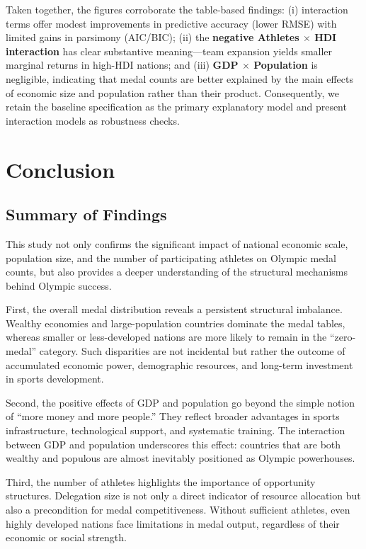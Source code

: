\documentclass[11pt,twoside]{article}
\numberwithin{Theorem}{section}
\numberwithin{Definition}{section}
\numberwithin{Lemma}{section}
\numberwithin{Algorithm}{section}
\numberwithin{equation}{section}
\begin{document}
Taken together, the figures corroborate the table-based findings: (i) interaction terms offer modest improvements in predictive accuracy (lower RMSE) with limited gains in parsimony (AIC/BIC); (ii) the \textbf{negative Athletes $\times$ HDI interaction} has clear substantive meaning—team expansion yields smaller marginal returns in high-HDI nations; and (iii) \textbf{GDP $\times$ Population} is negligible, indicating that medal counts are better explained by the main effects of economic size and population rather than their product. Consequently, we retain the baseline specification as the primary explanatory model and present interaction models as robustness checks.


\section{Conclusion}

\subsection{Summary of Findings}
This study not only confirms the significant impact of national economic scale, population size, and the number of participating athletes on Olympic medal counts, but also provides a deeper understanding of the structural mechanisms behind Olympic success.  

First, the overall medal distribution reveals a persistent structural imbalance. Wealthy economies and large-population countries dominate the medal tables, whereas smaller or less-developed nations are more likely to remain in the “zero-medal” category. Such disparities are not incidental but rather the outcome of accumulated economic power, demographic resources, and long-term investment in sports development.  

Second, the positive effects of GDP and population go beyond the simple notion of “more money and more people.” They reflect broader advantages in sports infrastructure, technological support, and systematic training. The interaction between GDP and population underscores this effect: countries that are both wealthy and populous are almost inevitably positioned as Olympic powerhouses.  

Third, the number of athletes highlights the importance of opportunity structures. Delegation size is not only a direct indicator of resource allocation but also a precondition for medal competitiveness. Without sufficient athletes, even highly developed nations face limitations in medal output, regardless of their economic or social strength.  
\end{document}
